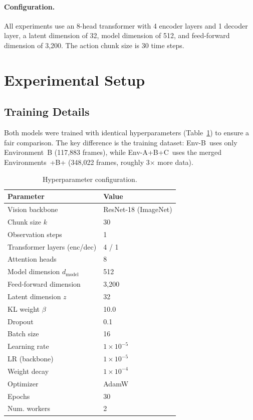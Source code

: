 \documentclass[twoside,twocolumn,10pt]{article}
\newcommand{\envB}{B}
\newcommand{\envABC}{A+B+C}
\newcommand{\chunksize}{30}
\begin{document}
\paragraph{Configuration.}
All experiments use an 8-head transformer with 4 encoder layers and 1 decoder
layer, a latent dimension of 32, model dimension of 512, and feed-forward
dimension of 3,200.  The action chunk size is $\chunksize{}$ time steps.

\section{Experimental Setup}

\subsection{Training Details}
\label{sec:training}

Both models were trained with identical hyperparameters (Table~\ref{tab:hyperparams})
to ensure a fair comparison.  The key difference is the training dataset:
Env-\envB~uses only Environment~\envB{} (117,883 frames), while Env-\envABC~uses
the merged Environments~\envA+\envB+\envC{} (348,022 frames, roughly 3$\times$
more data).

\begin{table}[H]
  \centering
  \caption{Hyperparameter configuration.}
  \label{tab:hyperparams}
  \begin{tabular}{ll}
    \toprule
    Parameter & Value \\
    \midrule
    Vision backbone & ResNet-18 (ImageNet) \\
    Chunk size $k$ & \chunksize{} \\
    Observation steps & 1 \\
    Transformer layers (enc/dec) & 4 / 1 \\
    Attention heads & 8 \\
    Model dimension $d_\text{model}$ & 512 \\
    Feed-forward dimension & 3,200 \\
    Latent dimension $z$ & 32 \\
    KL weight $\beta$ & 10.0 \\
    Dropout & 0.1 \\
    Batch size & 16 \\
    Learning rate & $1\times 10^{-5}$ \\
    LR (backbone) & $1\times 10^{-5}$ \\
    Weight decay & $1\times 10^{-4}$ \\
    Optimizer & AdamW \\
    Epochs & 30 \\
    Num. workers & 2 \\
    \bottomrule
  \end{tabular}
\end{table}
\end{document}
